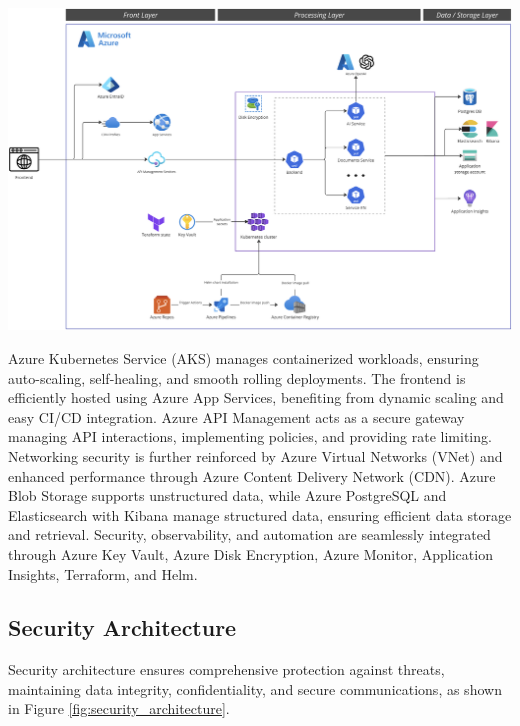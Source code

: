 \begin{center}
    \centering
    \includegraphics[width=1\textwidth]{Images/Infra Architecture.png}
    \label{fig:infra_architecture}
\end{center}

Azure Kubernetes Service (AKS) manages containerized workloads, ensuring auto-scaling, self-healing, and smooth rolling deployments. The frontend is efficiently hosted using Azure App Services, benefiting from dynamic scaling and easy CI/CD integration. Azure API Management acts as a secure gateway managing API interactions, implementing policies, and providing rate limiting. Networking security is further reinforced by Azure Virtual Networks (VNet) and enhanced performance through Azure Content Delivery Network (CDN). Azure Blob Storage supports unstructured data, while Azure PostgreSQL and Elasticsearch with Kibana manage structured data, ensuring efficient data storage and retrieval. Security, observability, and automation are seamlessly integrated through Azure Key Vault, Azure Disk Encryption, Azure Monitor, Application Insights, Terraform, and Helm.

\subsection{Security Architecture}
Security architecture ensures comprehensive protection against threats, maintaining data integrity, confidentiality, and secure communications, as shown in Figure \ref{fig:security_architecture}.

